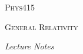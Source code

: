 \begin{titlepage}


\vspace*{1cm} %

\begin{center}
	
	
	\vspace{1.5cm}
	
	\fontsize{40}{40}
	\textsc{Phys415}
	
	\vspace{2cm}
	
	\fontsize{30}{30}
	\textsc{General Relativity}
	
	\vspace{2cm}
	
	\fontsize{25}{25}
	\textit{Lecture Notes}
\end{center}

\vspace*{\fill}


\vspace*{\fill}

\restoregeometry

\end{titlepage}